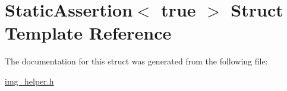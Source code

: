 \hypertarget{struct_static_assertion_3_01true_01_4}{}\section{Static\+Assertion$<$ true $>$ Struct Template Reference}
\label{struct_static_assertion_3_01true_01_4}


The documentation for this struct was generated from the following file\+:\begin{DoxyCompactItemize}
\item 
\hyperlink{img__helper_8h}{img\+\_\+helper.\+h}\end{DoxyCompactItemize}
